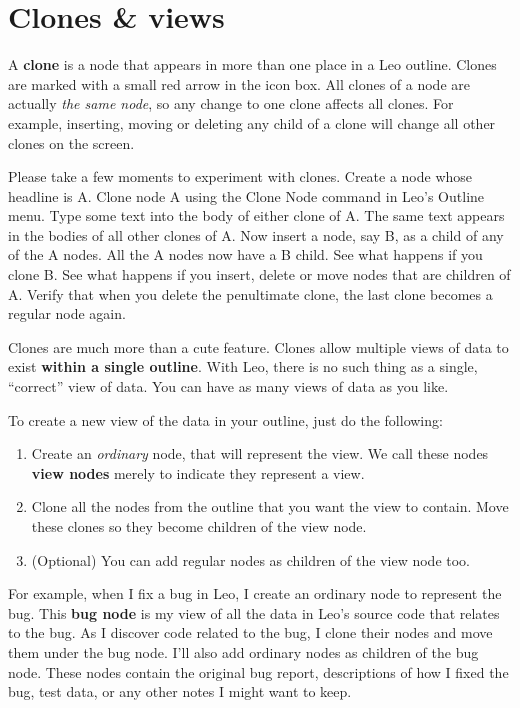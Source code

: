 \documentclass[a4paper,10pt,english]{sphinxmanual}
\begin{document}
\section{Clones \& views}
\label{intro:clones-views}
A \textbf{clone} is a node that appears in more than one place in a Leo outline.
Clones are marked with a small red arrow in the icon box. All clones of a node
are actually \emph{the same node}, so any change to one clone affects all clones. For
example, inserting, moving or deleting any child of a clone will change all
other clones on the screen.

Please take a few moments to experiment with clones. Create a node whose
headline is A. Clone node A using the Clone Node command in Leo's Outline menu.
Type some text into the body of either clone of A. The same text appears in the
bodies of all other clones of A. Now insert a node, say B, as a child of any of
the A nodes. All the A nodes now have a B child. See what happens if you clone
B. See what happens if you insert, delete or move nodes that are children of A.
Verify that when you delete the penultimate clone, the last clone becomes a
regular node again.

Clones are much more than a cute feature. Clones allow multiple views of data to
exist \textbf{within a single outline}. With Leo, there is no such thing as a single,
``correct'' view of data. You can have as many views of data as you like.

To create a new view of the data in your outline, just do the following:

\begin{enumerate}
\item {} 
Create an \emph{ordinary} node, that will represent the view. We call these nodes
\textbf{view nodes} merely to indicate they represent a view.

\item {} 
Clone all the nodes from the outline that you want the view to contain. Move
these clones so they become children of the view node.

\item {} 
(Optional) You can add regular nodes as children of the view node too.

\end{enumerate}

For example, when I fix a bug in Leo, I create an ordinary node to represent the
bug. This \textbf{bug node} is my view of all the data in Leo's source code that
relates to the bug. As I discover code related to the bug, I clone their nodes
and move them under the bug node. I'll also add ordinary nodes as children of
the bug node. These nodes contain the original bug report, descriptions of how I
fixed the bug, test data, or any other notes I might want to keep.
\end{document}
